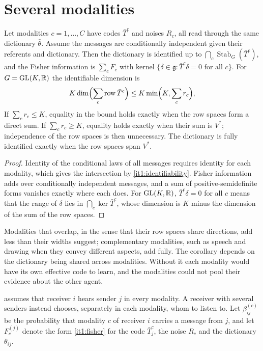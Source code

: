 \section{Several modalities}
\label{it1:ch-modalities}

Let modalities $c=1,\ldots,C$ have codes $\bar T^c$ and noises $R_c$, all read through the same dictionary $\bar\theta$. Assume the messages are conditionally independent given their referents and dictionary. Then the dictionary is identified up to $\bigcap_c\operatorname{Stab}_G(\bar T^c)$, and the Fisher information is $\sum_cF_c$ with kernel $\{\delta\in\mathfrak g:\bar T^c\delta=0\text{ for all }c\}$. For $G=\mathrm{GL}(K,\mathbb R)$ the identifiable dimension is
\begin{equation}
K\dim\Bigl(\sum_c\operatorname{row}\bar T^c\Bigr)\leq K\min\Bigl(K,\sum_cr_c\Bigr),
\label{it1:modalities-eq}
\end{equation}
If $\sum_c r_c\leq K$, equality in the bound holds exactly when the row spaces form a direct sum. If $\sum_c r_c\geq K$, equality holds exactly when their sum is $V^*$; independence of the row spaces is then unnecessary. The dictionary is fully identified exactly when the row spaces span $V^*$.
\begin{proof}
Identity of the conditional laws of all messages requires identity for each modality, which gives the intersection by \cref{it1:identifiability}. Fisher information adds over conditionally independent messages, and a sum of positive-semidefinite forms vanishes exactly where each does. For $\mathrm{GL}(K,\mathbb R)$, $\bar T^c\delta=0$ for all $c$ means that the range of $\delta$ lies in $\bigcap_c\ker\bar T^c$, whose dimension is $K$ minus the dimension of the sum of the row spaces.
\end{proof}

Modalities that overlap, in the sense that their row spaces share directions, add less than their widths suggest; complementary modalities, such as speech and drawing when they convey different aspects, add fully. The corollary depends on the dictionary being shared across modalities. Without it each modality would have its own effective code to learn, and the modalities could not pool their evidence about the other agent.

 assumes that receiver $i$ hears sender $j$ in every modality. A receiver with several senders instead chooses, separately in each modality, whom to listen to. Let $\beta^{(c)}_{ij}$ be the probability that modality $c$ of receiver $i$ carries a message from $j$, and let $F_c^{(j)}$ denote the form \cref{it1:fisher} for the code $\bar T_j^c$, the noise $R_c$ and the dictionary $\bar\theta_{ij}$.


